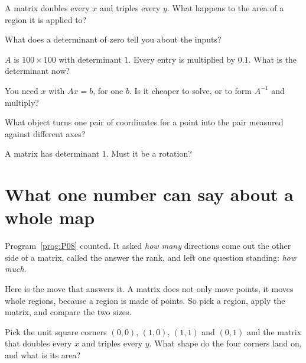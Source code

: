 \begin{quiz}
\item A matrix doubles every $x$ and triples every $y$. What happens to the
  area of a region it is applied to? 
\item What does a determinant of zero tell you about the inputs?
\item $A$ is $100 \times 100$ with determinant $1$. Every entry is multiplied
  by $\num{0.1}$. What is the determinant now? 
\item You need $x$ with $Ax = b$, for one $b$. Is it cheaper to solve, or to
  form $A^{-1}$ and multiply? 
\item What object turns one pair of coordinates for a point into the pair
  measured against different axes? 
\item A matrix has determinant $1$. Must it be a rotation? 
\end{quiz}

\section{What one number can say about a whole map}
\label{sec:P09-signed-area}

\begin{fr}
Program~\ref{prog:P08} counted. It asked \emph{how many} directions come out
the other side of a matrix, called the answer the rank, and left one question
standing: \emph{how much}.

Here is the move that answers it. A matrix does not only move points, it moves
whole regions, because a region is made of points. So pick a region, apply the
matrix, and compare the two sizes.

Pick the unit square \dash{} corners $(0,0)$, $(1,0)$, $(1,1)$ and $(0,1)$
\dash{} and the matrix that doubles every $x$ and triples every $y$. What shape
do the four corners land on, and what is its area?
\dotline
\nextframe
\end{fr}

